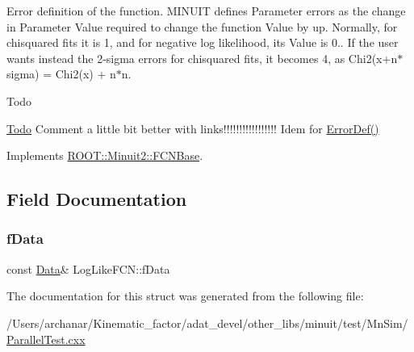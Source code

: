 Error definition of the function. M\+I\+N\+U\+IT defines Parameter errors as the change in Parameter Value required to change the function Value by up. Normally, for chisquared fits it is 1, and for negative log likelihood, its Value is 0.. If the user wants instead the 2-\/sigma errors for chisquared fits, it becomes 4, as Chi2(x+n$\ast$sigma) = Chi2(x) + n$\ast$n.

\begin{DoxyRefDesc}{Todo}
\item[\mbox{\hyperlink{todo__todo000001}{Todo}}]Comment a little bit better with links!!!!!!!!!!!!!!!!! Idem for \mbox{\hyperlink{classROOT_1_1Minuit2_1_1FCNBase_ac4592475c58a65b037ba97ab5f3cba10}{Error\+Def()}}\end{DoxyRefDesc}


Implements \mbox{\hyperlink{classROOT_1_1Minuit2_1_1FCNBase_a04ef08ddad92ce8d89d498efbe021c39}{R\+O\+O\+T\+::\+Minuit2\+::\+F\+C\+N\+Base}}.



\subsection{Field Documentation}
\mbox{\label{structLogLikeFCN_a9331b5750c8fbb26d3e4c1324c2b712f}} 
\subsubsection{\texorpdfstring{fData}{fData}}
{\footnotesize\ttfamily const \mbox{\hyperlink{ParallelTest_8cxx_a1766b42441c3f4d78bb2b56263a8e058}{Data}}\& Log\+Like\+F\+C\+N\+::f\+Data}



The documentation for this struct was generated from the following file\+:\begin{DoxyCompactItemize}
\item 
/\+Users/archanar/\+Kinematic\+\_\+factor/adat\+\_\+devel/other\+\_\+libs/minuit/test/\+Mn\+Sim/\mbox{\hyperlink{ParallelTest_8cxx}{Parallel\+Test.\+cxx}}\end{DoxyCompactItemize}
